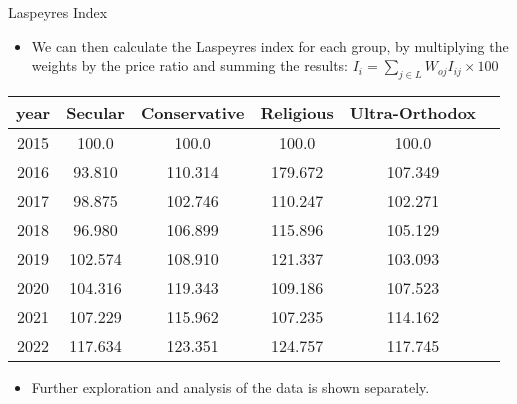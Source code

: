 \documentclass{beamer}
\begin{document}
\begin{frame}{Laspeyres Index}
    \begin{itemize}
        \item We can then calculate the Laspeyres index for each group, by multiplying the weights by the price ratio and summing the results: $I_{i}=\sum_{j\in L}W_{oj}I_{ij}\times 100$
    \end{itemize}
    \begin{table}
        \begin{tabular}{c c c c c c}
            \hline
            \textbf{year} & \textbf{Secular} & \textbf{Conservative} & \textbf{Religious} & \textbf{Ultra-Orthodox} \\
            \hline
            2015          & 100.0            & 100.0                 & 100.0              & 100.0                   \\
            \hline
            2016          & 93.810           & 110.314               & 179.672            & 107.349                 \\
            \hline
            2017          & 98.875           & 102.746               & 110.247            & 102.271                 \\
            \hline
            2018          & 96.980           & 106.899               & 115.896            & 105.129                 \\
            \hline
            2019          & 102.574          & 108.910               & 121.337            & 103.093                 \\
            \hline
            2020          & 104.316          & 119.343               & 109.186            & 107.523                 \\
            \hline
            2021          & 107.229          & 115.962               & 107.235            & 114.162                 \\
            \hline
            2022          & 117.634          & 123.351               & 124.757            & 117.745                 \\
            \hline
        \end{tabular}
    \end{table}
    \begin{itemize}
        \item Further exploration and analysis of the data is shown separately.
    \end{itemize}
\end{frame}
\end{document}

